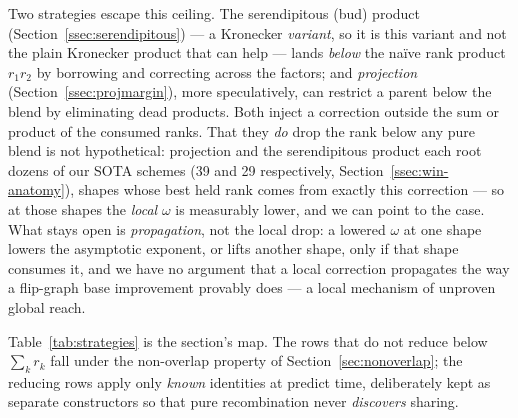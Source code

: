 Two strategies escape this ceiling. The serendipitous (bud) product
(Section~\ref{ssec:serendipitous}) --- a Kronecker \emph{variant}, so it is this variant and
not the plain Kronecker product that can help --- lands \emph{below} the naïve rank product
\(r_1 r_2\) by borrowing and correcting across the factors; and \emph{projection}
(Section~\ref{ssec:projmargin}), more speculatively, can restrict a parent below the blend
by eliminating dead products. Both inject a correction outside the sum or product of the
consumed ranks. That they \emph{do} drop the rank below any pure blend is not hypothetical:
projection and the serendipitous product each root dozens of our SOTA schemes (39 and 29
respectively, Section~\ref{ssec:win-anatomy}), shapes whose best held rank comes from exactly
this correction --- so at those shapes the \emph{local} \(\omega\) is measurably lower, and
we can point to the case. What stays open is \emph{propagation}, not the local drop: a
lowered \(\omega\) at one shape lowers the asymptotic exponent, or lifts another shape, only
if that shape consumes it, and we have no argument that a local correction propagates the way
a flip-graph base improvement provably does --- a local mechanism of unproven global reach.

Table~\ref{tab:strategies} is the section's map. The rows that do not reduce below
\(\sum_k r_k\) fall under the non-overlap property of Section~\ref{sec:nonoverlap}; the
reducing rows apply only \emph{known} identities at predict time, deliberately kept as
separate constructors so that pure recombination never \emph{discovers} sharing.

